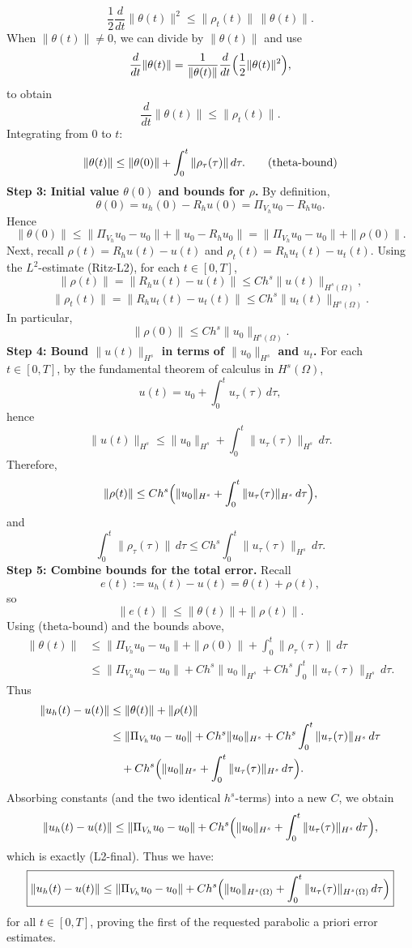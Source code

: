 \[
    \frac{1}{2}\frac{d}{dt}\|\theta(t)\|^2
    \le \|\rho_t(t)\|\,\|\theta(t)\|.
\]
When $\|\theta(t)\|\neq 0$, we can divide by $\|\theta(t)\|$ and use
\[
    \frac{d}{dt}\|\theta(t)\|
    = \frac{1}{\|\theta(t)\|}\frac{d}{dt}\Bigl(\frac12\|\theta(t)\|^2\Bigr),
\]
to obtain
\[
    \frac{d}{dt}\|\theta(t)\| \le \|\rho_t(t)\|.
\]
Integrating from $0$ to $t$:
\[
    \|\theta(t)\| \le \|\theta(0)\| + \int_0^t \|\rho_\tau(\tau)\|\,d\tau. \tag{\text{theta-bound}}
\]
\textbf{Step 3: Initial value $\theta(0)$ and bounds for $\rho$.}
By definition,
\[
    \theta(0) = u_h(0) - R_h u(0) = \Pi_{V_h}u_0 - R_h u_0.
\]
Hence
\[
    \|\theta(0)\|
    \le \|\Pi_{V_h}u_0 - u_0\| + \|u_0 - R_h u_0\|
    = \|\Pi_{V_h}u_0 - u_0\| + \|\rho(0)\|.
\]
Next, recall \(\rho(t) = R_h u(t) - u(t)\) and
\(\rho_t(t) = R_h u_t(t) - u_t(t)\).
Using the \(L^2\)-estimate (Ritz-L2), for each \(t\in[0,T]\),
\[
    \|\rho(t)\| = \|R_h u(t) - u(t)\|
    \le C h^s \|u(t)\|_{H^s(\Omega)},
\]
\[
    \|\rho_t(t)\| = \|R_h u_t(t) - u_t(t)\|
    \le C h^s \|u_t(t)\|_{H^s(\Omega)}.
\]
In particular,
\[
    \|\rho(0)\| \le C h^s \|u_0\|_{H^s(\Omega)}.
\]
\textbf{Step 4: Bound $\|u(t)\|_{H^s}$ in terms of $\|u_0\|_{H^s}$ and $u_t$.}
For each $t\in[0,T]$, by the fundamental theorem of calculus in $H^s(\Omega)$,
\[
    u(t) = u_0 + \int_0^t u_\tau(\tau)\,d\tau,
\]
hence
\[
    \|u(t)\|_{H^s}
    \le \|u_0\|_{H^s} + \int_0^t \|u_\tau(\tau)\|_{H^s}\,d\tau.
\]
Therefore,
\[
    \|\rho(t)\|
    \le C h^s\Bigl(\|u_0\|_{H^s} + \int_0^t \|u_\tau(\tau)\|_{H^s}\,d\tau\Bigr),
\]
and
\[
    \int_0^t \|\rho_\tau(\tau)\|\,d\tau
    \le C h^s \int_0^t \|u_\tau(\tau)\|_{H^s}\,d\tau.
\]
\textbf{Step 5: Combine bounds for the total error.}
Recall
\[
    e(t) := u_h(t) - u(t) = \theta(t) + \rho(t),
\]
so
\[
    \|e(t)\|\le \|\theta(t)\| + \|\rho(t)\|.
\]
Using (theta-bound) and the bounds above,
\[
    \begin{aligned}
        \|\theta(t)\|
         & \le \|\Pi_{V_h}u_0 - u_0\| + \|\rho(0)\|
        + \int_0^t \|\rho_\tau(\tau)\|\,d\tau       \\
         & \le \|\Pi_{V_h}u_0 - u_0\|
        + C h^s \|u_0\|_{H^s}
        + C h^s \int_0^t \|u_\tau(\tau)\|_{H^s}\,d\tau.
    \end{aligned}
\]
Thus
\[
    \begin{aligned}
        \|u_h(t) - u(t)\|
         & \le \|\theta(t)\| + \|\rho(t)\|             \\
         & \le \|\Pi_{V_h}u_0 - u_0\|
        + C h^s \|u_0\|_{H^s}
        + C h^s \int_0^t \|u_\tau(\tau)\|_{H^s}\,d\tau \\
         & \quad
        + C h^s \Bigl(\|u_0\|_{H^s} + \int_0^t \|u_\tau(\tau)\|_{H^s}\,d\tau\Bigr).
    \end{aligned}
\]
Absorbing constants (and the two identical \(h^s\)-terms) into a new \(C\), we obtain
\[
    \|u_h(t) - u(t)\|
    \le \|\Pi_{V_h}u_0 - u_0\|
    + C h^s \Bigl(\|u_0\|_{H^s} + \int_0^t \|u_\tau(\tau)\|_{H^s}\,d\tau\Bigr),
\]
which is exactly (L2-final).
Thus we have:
\[
    \boxed{
        \|u_h(t) - u(t)\|
        \le \|\Pi_{V_h}u_0 - u_0\|
        + C h^s\Bigl(\|u_0\|_{H^s(\Omega)} + \int_0^t \|u_\tau(\tau)\|_{H^s(\Omega)}\,d\tau\Bigr)
    }
\]
for all \(t\in[0,T]\), proving the first of the requested parabolic a priori error estimates.


